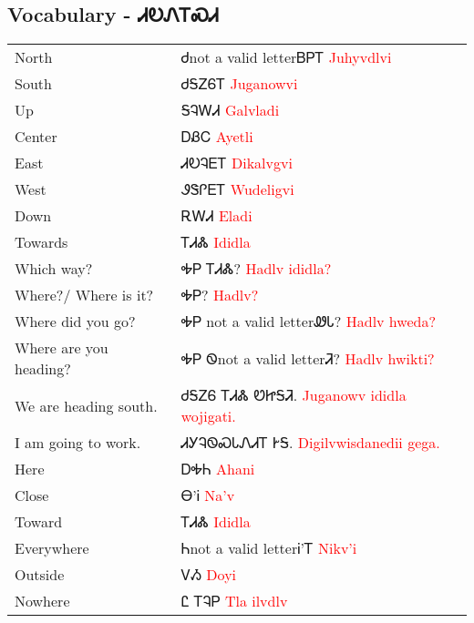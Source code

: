 \begin{multicols}
\newpage\subsection{Vocabulary - ᏗᎧᏁᎢᏍᏗ 
}
\begin{minipage}{\linewidth}
\begin{tabular}{p{5cm} p{9cm}}
North & Ꮷnot a valid letterᏴᏢᎢ 
 \newline \textcolor{red}{Juhyvdlvi}\\
South & ᏧᎦᏃᏮᎢ 
 \newline \textcolor{red}{Juganowvi}\\
Up & ᎦᎸᎳᏗ 
 \newline \textcolor{red}{Galvladi}\\
Center & ᎠᏰᏟ 
 \newline \textcolor{red}{Ayetli}\\
East & ᏗᎧᎸᎬᎢ 
 \newline \textcolor{red}{Dikalvgvi}\\
West & ᏭᏕᎵᎬᎢ 
 \newline \textcolor{red}{Wudeligvi}\\
Down & ᎡᎳᏗ 
 \newline \textcolor{red}{Eladi}\\
Towards & ᎢᏗᏜ 
 \newline \textcolor{red}{Ididla}\\
Which way? & ᎭᏢ ᎢᏗᏜ? 
 \newline \textcolor{red}{Hadlv ididla?}\\
Where?/ Where is it? & ᎭᏢ? 
 \newline \textcolor{red}{Hadlv?}\\
Where did you go? & ᎭᏢ not a valid letterᏪᏓ? 
 \newline \textcolor{red}{Hadlv hweda?}\\
Where are you heading? & ᎭᏢ Ꮻnot a valid letterᏘ? 
 \newline \textcolor{red}{Hadlv hwikti?}\\
We are heading south. & ᏧᎦᏃᏮ ᎢᏗᏜ ᏬᏥᎦᏘ. 
 \newline \textcolor{red}{Juganowv ididla wojigati.}\\
I am going to work. & ᏗᎩᎸᏫᏍᏓᏁᏗᎢ ᎨᎦ. 
 \newline \textcolor{red}{Digilvwisdanedii gega.}\\
Here & ᎠᎭᏂ 
 \newline \textcolor{red}{Ahani}\\
Close & Ꮎ’Ꭵ 
 \newline \textcolor{red}{Na’v}\\
Toward & ᎢᏗᏜ 
 \newline \textcolor{red}{Ididla}\\
Everywhere & Ꮒnot a valid letterᎥ’Ꭲ 
 \newline \textcolor{red}{Nikv’i}\\
Outside & ᏙᏱ 
 \newline \textcolor{red}{Doyi}\\
Nowhere & Ꮭ ᎢᎸᏢ 
 \newline \textcolor{red}{Tla ilvdlv}\\
\end{tabular}
\end{minipage}


\end{multicols}
